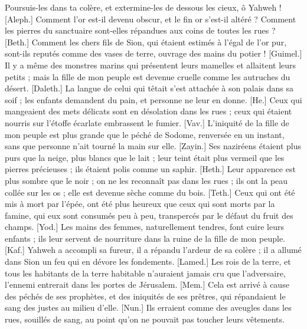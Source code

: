 \begin{multicols}{2}
Poursuis-les dans ta colère, et extermine-les de dessous les cieux, ô Yahweh !
\VerseOne{}[Aleph.] Comment l'or est-il devenu obscur, et le fin or s'est-il altéré ? Comment les pierres du sanctuaire sont-elles répandues aux coins de toutes les rues ?
[Beth.] Comment les chers fils de Sion, qui étaient estimés à l'égal de l'or pur, sont-ils reputés comme des vases de terre, ouvrage des mains du potier !
[Guimel.] Il y a même des monstres marins qui présentent leurs mamelles et allaitent leurs petits ; mais la fille de mon peuple est devenue cruelle comme les autruches du désert.
[Daleth.] La langue de celui qui têtait s'est attachée à son palais dans sa soif ; les enfants demandent du pain, et personne ne leur en donne.
[He.] Ceux qui mangeaient des mets délicats sont en désolation dans les rues ; ceux qui étaient nourris sur l'étoffe écarlate embrassent le fumier.
[Vav.] L'iniquité de la fille de mon peuple est plus grande que le péché de Sodome, renversée en un instant, sans que personne n'ait tourné la main sur elle.
[Zayin.] Ses naziréens étaient plus purs que la neige, plus blancs que le lait ; leur teint était plus vermeil que les pierres précieuses ; ils étaient polis comme un saphir.
[Heth.] Leur apparence est plus sombre que le noir ; on ne les reconnaît pas dans les rues ; ils ont la peau collée sur les os ; elle est devenue sèche comme du bois.
[Teth.] Ceux qui ont été mis à mort par l'épée, ont été plus heureux que ceux qui sont morts par la famine, qui eux sont consumés peu à peu, transpercés par le défaut du fruit des champs.
[Yod.] Les mains des femmes, naturellement tendres, font cuire leurs enfants ; ils leur servent de nourriture dans la ruine de la fille de mon peuple.
[Kaf.] Yahweh a accompli sa fureur, il a répandu l'ardeur de sa colère ; il a allumé dans Sion un feu qui en dévore les fondements.
[Lamed.] Les rois de la terre, et tous les habitants de la terre habitable n'auraient jamais cru que l'adversaire, l'ennemi entrerait dans les portes de Jérusalem.
[Mem.] Cela est arrivé à cause des péchés de ses prophètes, et des iniquités de ses prêtres, qui répandaient le sang des justes au milieu d'elle.
[Nun.] Ils erraient comme des aveugles dans les rues, souillés de sang, au point qu'on ne pouvait pas toucher leurs vêtements.

\end{multicols}
